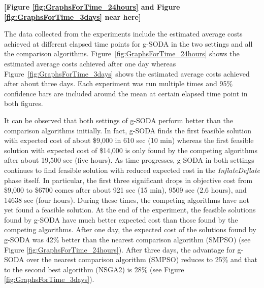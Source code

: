 \documentclass[a4paper, 12pt]{article} %
\begin{document}
\textbf{[Figure \ref{fig:GraphsForTime_24hours} and Figure \ref{fig:GraphsForTime_3days} near here]}


The data collected from the experiments include the estimated average costs achieved at different elapsed time points for g-SODA in the two settings and all the comparison algorithms. 
Figure~\ref{fig:GraphsForTime_24hours} shows the estimated average costs achieved after one day whereas Figure~\ref{fig:GraphsForTime_3days} shows the estimated average costs achieved after about three days. 
Each experiment was run multiple times and 95\% confidence bars are included around the mean at certain elapsed time point in both figures. 

It can be observed that both settings of g-SODA perform better than the comparison algorithms initially. In fact, g-SODA finds the first feasible solution with expected cost of about \$9,000 in 610 sec (10 min) whereas the first feasible solution with expected cost of \$14,000 is only found by the competing algorithms after about 19,500 sec (five hours). 
As time progresses, g-SODA in both settings continues to find feasible solution with reduced expected cost in the \textit{InflateDeflate} phase itself. In particular, the first three significant drops in objective cost from \$9,000 to \$6700 comes after about 921 sec (15 min), 9509 sec (2.6 hours), and 14638 sec (four hours). During these times, the competing algorithms have not yet found a feasible solution.
At the end of the experiment, the feasible solutions found by g-SODA  have much better expected cost than those found by the competing algorithms. After one day, the expected cost of the solutions found by g-SODA was 42\% better than the nearest comparison algorithm (SMPSO) (see Figure \ref{fig:GraphsForTime_24hours}). After three days, the advantage for g-SODA over the nearest comparison algorithm (SMPSO) reduces to 25\% and that to the second best algorithm (NSGA2) is 28\% (see Figure \ref{fig:GraphsForTime_3days}). 
\end{document}
